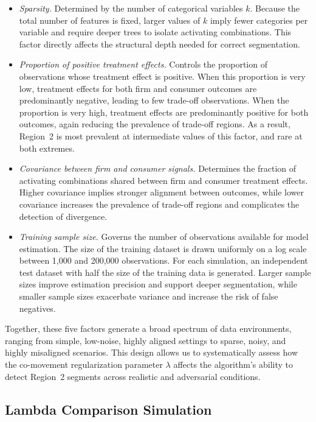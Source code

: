 \documentclass[11pt,letterpaper,english]{article}
\theoremstyle{definition}
\theoremstyle{definition}
\begin{document}
\begin{bibunit}
\begin{itemize}
    \item \emph{Sparsity.}  
    Determined by the number of categorical variables $k$. Because the total number of features is fixed, larger values of $k$ imply fewer categories per variable and require deeper trees to isolate activating combinations. This factor directly affects the structural depth needed for correct segmentation.

    \item \emph{Proportion of positive treatment effects.}  
Controls the proportion of observations whose treatment effect is positive. When this proportion is very low, treatment effects for both firm and consumer outcomes are predominantly negative, leading to few trade-off observations. When the proportion is very high, treatment effects are predominantly positive for both outcomes, again reducing the prevalence of trade-off regions. As a result, Region~2 is most prevalent at intermediate values of this factor, and rare at both extremes.


    \item \emph{Covariance between firm and consumer signals.}  
    Determines the fraction of activating combinations shared between firm and consumer treatment effects. Higher covariance implies stronger alignment between outcomes, while lower covariance increases the prevalence of trade-off regions and complicates the detection of divergence.

    \item \emph{Training sample size.}  
    Governs the number of observations available for model estimation. The size of the training dataset is drawn uniformly on a log scale between 1{,}000 and 200{,}000 observations. For each simulation, an independent test dataset with half the size of the training data is generated. Larger sample sizes improve estimation precision and support deeper segmentation, while smaller sample sizes exacerbate variance and increase the risk of false negatives.
\end{itemize}


Together, these five factors generate a broad spectrum of data environments, ranging from simple, low-noise, highly aligned settings to sparse, noisy, and highly misaligned scenarios. This design allows us to systematically assess how the co-movement regularization parameter $\lambda$ affects the algorithm’s ability to detect Region~2 segments across realistic and adversarial conditions.

\subsection{Lambda Comparison Simulation}
\label{sec:lambda-comparison}


\end{bibunit}
\end{document}
